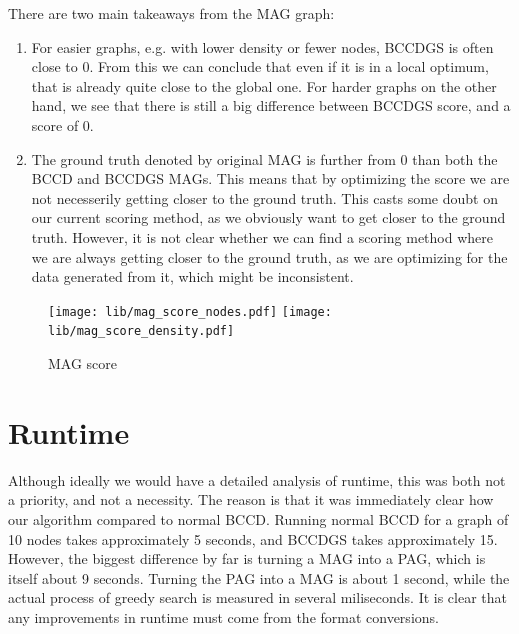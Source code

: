 \documentclass[11pt,a4paper]{report}
\theoremstyle{definition}
\begin{document}
There are two main takeaways from the MAG graph:
\begin{enumerate}
  \item For easier graphs, e.g. with lower density or fewer nodes, BCCDGS
    is often close to 0. From this we can conclude that even if it is in a
    local optimum, that is already quite close to the global one.
    For harder graphs on the other hand, we see that there is still a big
    difference between BCCDGS score, and a score of 0.

  \item The ground truth denoted by original MAG is further from 0 than
    both the BCCD and BCCDGS MAGs. This means that by optimizing the score
    we are not necesserily getting closer to the ground truth. This casts
    some doubt on our current scoring method, as we obviously want to get
    closer to the ground truth. However, it is not clear whether we can
    find a scoring method where we are always getting closer to the ground
    truth, as we are optimizing for the data generated from it, which
    might be inconsistent.

\end{enumerate}

\begin{figure}
  \centering
  \texttt{[image: lib/mag\_score\_nodes.pdf]}
  \texttt{[image: lib/mag\_score\_density.pdf]}
  \caption{MAG score}
  \label{fig:mag_score}
\end{figure}

\section{Runtime}\label{runtime}
Although ideally we would have a detailed analysis of runtime, this was
both not a priority, and not a necessity. The reason is that it was
immediately clear how our algorithm compared to normal BCCD. Running
normal BCCD for a graph of 10 nodes takes approximately 5 seconds, and
BCCDGS takes approximately 15. However, the biggest difference by far is
turning a MAG into a PAG, which is itself about 9 seconds. Turning the PAG
into a MAG is about 1 second, while the actual process of greedy search is
measured in several miliseconds. It is clear that any improvements in
runtime must come from the format conversions.

\end{document}
